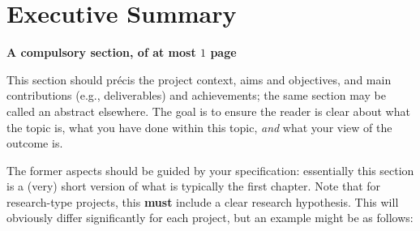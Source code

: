 \documentclass[
author={Veyndan Stuart},
supervisor={Prof. Dave Cliff},
degree={MEng},
title={Some Structural Guidelines for CS MEng Dissertations},
subtitle={},
type={enterprise},
year={2019}
]{thesis}
\begin{document}
    \maketitle

    \frontmatter


    \makedecl


    \tableofcontents
    \listoffigures
    \listoftables
    \listofalgorithms
    \lstlistoflistings



    \chapter*{Executive Summary}

    {\bf A compulsory section, of at most $1$ page}
    \vspace{1cm}

    \noindent
    This section should pr\'{e}cis the project context, aims and objectives,
    and main contributions (e.g., deliverables) and achievements; the same
    section may be called an abstract elsewhere. The goal is to ensure the
    reader is clear about what the topic is, what you have done within this
    topic, {\em and} what your view of the outcome is.

    The former aspects should be guided by your specification: essentially
    this section is a (very) short version of what is typically the first
    chapter. Note that for research-type projects, this {\bf must} include
    a clear research hypothesis. This will obviously differ significantly
    for each project, but an example might be as follows:
\end{document}
